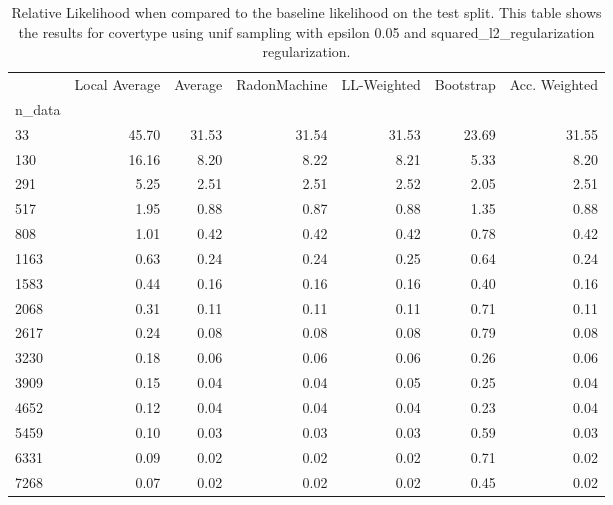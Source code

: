 \begin{table}
\centering
\caption{Relative Likelihood when compared to the baseline likelihood on the test split. This table shows the results for  covertype using  unif sampling with epsilon  0.05 and  squared_l2_regularization regularization.}
\label{tab:13}
\begin{tabular}{lrrrrrr}
\toprule
{} &  Local Average &  Average &  RadonMachine &  LL-Weighted &  Bootstrap &  Acc. Weighted \\
n\_data &                &          &               &              &            &                \\
\midrule
33     &          45.70 &    31.53 &         31.54 &        31.53 &      23.69 &          31.55 \\
130    &          16.16 &     8.20 &          8.22 &         8.21 &       5.33 &           8.20 \\
291    &           5.25 &     2.51 &          2.51 &         2.52 &       2.05 &           2.51 \\
517    &           1.95 &     0.88 &          0.87 &         0.88 &       1.35 &           0.88 \\
808    &           1.01 &     0.42 &          0.42 &         0.42 &       0.78 &           0.42 \\
1163   &           0.63 &     0.24 &          0.24 &         0.25 &       0.64 &           0.24 \\
1583   &           0.44 &     0.16 &          0.16 &         0.16 &       0.40 &           0.16 \\
2068   &           0.31 &     0.11 &          0.11 &         0.11 &       0.71 &           0.11 \\
2617   &           0.24 &     0.08 &          0.08 &         0.08 &       0.79 &           0.08 \\
3230   &           0.18 &     0.06 &          0.06 &         0.06 &       0.26 &           0.06 \\
3909   &           0.15 &     0.04 &          0.04 &         0.05 &       0.25 &           0.04 \\
4652   &           0.12 &     0.04 &          0.04 &         0.04 &       0.23 &           0.04 \\
5459   &           0.10 &     0.03 &          0.03 &         0.03 &       0.59 &           0.03 \\
6331   &           0.09 &     0.02 &          0.02 &         0.02 &       0.71 &           0.02 \\
7268   &           0.07 &     0.02 &          0.02 &         0.02 &       0.45 &           0.02 \\
\bottomrule
\end{tabular}
\end{table}
